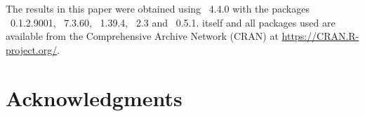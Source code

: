 \documentclass[%
    twoside, openright, titlepage, numbers=noenddot,%
    cleardoublepage=empty,%
    abstract=false,%
    BCOR=5.5mm, paper=a5, fontsize=10pt,%
]{scrreprt}
\begin{document}
The results in this paper were obtained using
~4.4.0 with the packages
~0.1.2.9001, ~7.3.60, ~1.39.4, ~2.3 and ~0.5.1.  itself
and all packages used are available from the Comprehensive
 Archive Network (CRAN) at
\url{https://CRAN.R-project.org/}.


\section*{Acknowledgments}

\cleardoublepage%
\def\dir{chapters/conclusion_outlook}


\appendix
\cleardoublepage%
\def\dir{chapters/appendix}


\cleardoublepage

\cleardoublepage
\cleardoublepage
\end{document}

